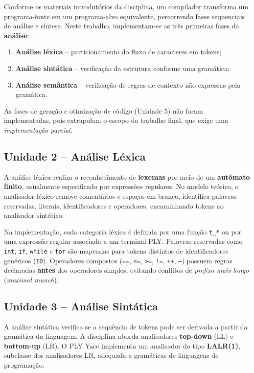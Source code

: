 \documentclass[12pt,a4paper]{article}
\begin{document}
Conforme os materiais introdutórios da disciplina, um compilador transforma um
programa-fonte em um programa-alvo equivalente, percorrendo fases sequenciais de
análise e síntese. Neste trabalho, implementam-se as três primeiras fases da
\textbf{análise}:

\begin{enumerate}
  \item \textbf{Análise léxica} -- particionamento do fluxo de caracteres em tokens;
  \item \textbf{Análise sintática} -- verificação da estrutura conforme uma gramática;
  \item \textbf{Análise semântica} -- verificação de regras de contexto não expressas
        pela gramática.
\end{enumerate}

As fases de geração e otimização de código (Unidade 5) não foram implementadas,
pois extrapolam o escopo do trabalho final, que exige uma \textit{implementação
parcial}.

\subsection{Unidade 2 -- Análise Léxica}

A análise léxica realiza o reconhecimento de \textbf{lexemas} por meio de um
\textbf{autômato finito}, usualmente especificado por expressões regulares. No modelo
teórico, o analisador léxico remove comentários e espaços em branco, identifica
palavras reservadas, literais, identificadores e operadores, encaminhando tokens ao
analisador sintático.

Na implementação, cada categoria léxica é definida por uma função \texttt{t\_*} ou
por uma expressão regular associada a um terminal PLY. Palavras reservadas como
\texttt{int}, \texttt{if}, \texttt{while} e \texttt{for} são mapeadas para tokens
distintos de identificadores genéricos (\texttt{ID}). Operadores compostos
(\texttt{==}, \texttt{<=}, \texttt{>=}, \texttt{!=}, \texttt{++}, \texttt{--})
possuem regras declaradas \textbf{antes} dos operadores simples, evitando conflitos
de \textit{prefixo mais longo} (\textit{maximal munch}).

\subsection{Unidade 3 -- Análise Sintática}

A análise sintática verifica se a sequência de tokens pode ser derivada a partir da
gramática da linguagem. A disciplina aborda analisadores \textbf{top-down} (LL) e
\textbf{bottom-up} (LR). O PLY Yacc implementa um analisador do tipo \textbf{LALR(1)},
subclasse dos analisadores LR, adequada a gramáticas de linguagens de programação.
\end{document}
